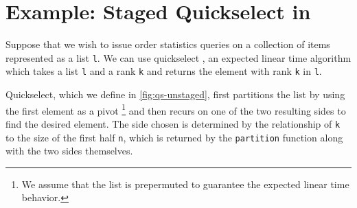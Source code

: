 
\section {Example: Staged Quickselect in \texorpdfstring{\lang}{λ12}}
\label{sec:staging}

\begin{abstrsyn}





Suppose that we wish to issue order statistics queries on a collection of items
represented as a list \texttt{l}. We can use quickselect \cite{quickselect}, an
expected linear time algorithm which takes a list \texttt{l} and a rank
\texttt{k} and returns the element with rank \texttt{k} in \texttt{l}.

Quickselect, which we define in \ref{fig:qs-unstaged}, first partitions the list
by using the first element as a pivot%
\footnote{We assume that the list is prepermuted to guarantee the expected
linear time behavior.}
and then recurs on one of the two resulting sides to find the desired element.
The side chosen is determined by the relationship of \texttt{k} to the size of
the first half \texttt{n}, which is returned by the \texttt{partition} function
along with the two sides themselves.


\end{abstrsyn}
